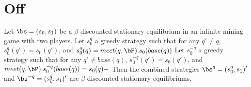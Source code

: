 

\section{Off}

\begin{myprop}
	Let $\bs = (s_0,s_1)$ be a $\beta$ discounted stationary equilibrium in an infinite mining game with two players. 
	Let $s^q_0$ a greedy strategy such that for any $q' \neq q$, $s^q_0(q') = s_0(q')$, and $s^q_0(q) = meet(q,\bP) . s_0(base(q))$
	Let $s^{-q}_0$ a greedy strategy such that for any $q' \neq base(q)$, $s^{-q}_0(q') = s_0(q')$, and $meet(q,\bP).s^{-q}_0(base(q)) =  s_0(q)-$
	Then the combined strategies $\bs^q = (s^q_0,s_1)'$ and $\bs^{-q} = (s^q_0,s_1)'$  are $\beta$ discounted stationary equilibriums.
\end{myprop}

